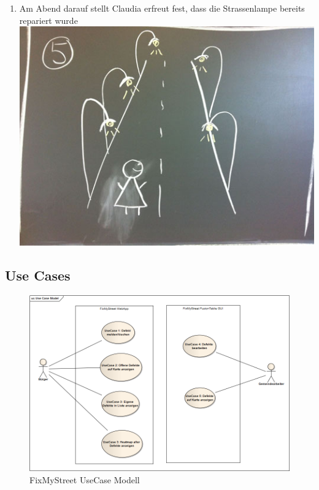 \begin{enumerate}
\item Am Abend darauf stellt Claudia erfreut fest, dass die Strassenlampe bereits repariert wurde \\ \includegraphics[scale=0.4]{images/usecase2-fixmystreet/storyboard/fixmystreet-storyboard-5.jpg}
\end{enumerate}

\subsection{Use Cases}

\begin{figure}[h!]
	\centering
	\includegraphics[scale=0.4]{images/usecase2-fixmystreet/uml/fixmystreet-usecasemodel.png}
	\caption{FixMyStreet UseCase Modell}
	\label{fixmystreet-usecasemodel}
\end{figure}

